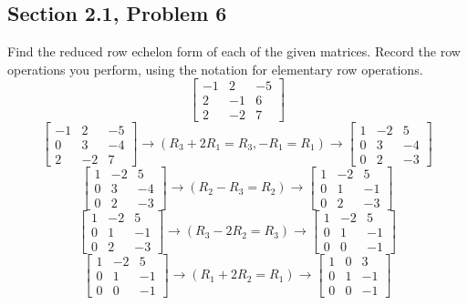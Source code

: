 \documentclass[letterpaper]{report}
\begin{document}
\subsection{Section 2.1, Problem 6}%
\label{sub:Section 2.1, Problem 6}
Find the reduced row echelon form of each of the given matrices. Record the row operations you perform, using the notation for elementary row operations. 
        \[
        \begin{bmatrix}
            -1 & 2 & -5 \\
            2 & -1 & 6 \\
            2 & -2 & 7
        \end{bmatrix}
   \] 
\[
\begin{bmatrix} 
    -1 & 2 & -5 \\
    0 & 3 & -4 \\
    2 & -2 & 7
\end{bmatrix} \to (R_3 + 2R_1 = R_3, -R_1 = R_1) \to
\begin{bmatrix} 
    1 & -2 & 5 \\
    0 & 3 & -4 \\
    0 & 2 & -3
\end{bmatrix} 
\] 
\[
\begin{bmatrix} 
    1 & -2 & 5 \\
    0 & 3 & -4 \\
    0 & 2 & -3
\end{bmatrix} 
\to (R_2 - R_3= R_2) \to 
\begin{bmatrix} 
    1 & -2 & 5 \\
    0 & 1 & -1 \\
    0 & 2 & -3
\end{bmatrix} 
\] 
\[
\begin{bmatrix} 
    1 & -2 & 5 \\
    0 & 1 & -1 \\
    0 & 2 & -3
\end{bmatrix} \to 
(R_3 - 2R_2 = R_3) \to
\begin{bmatrix} 
    1 & -2 & 5 \\
    0 & 1 & -1 \\
    0 & 0 & -1
\end{bmatrix}
\] 
\[
\begin{bmatrix} 
    1 & -2 & 5 \\
    0 & 1 & -1 \\
    0 & 0 & -1
\end{bmatrix}
\to (R_1 + 2R_2= R_1) \to 
\begin{bmatrix} 
    1 & 0 & 3 \\
    0 & 1 & -1 \\
    0 & 0 & -1  
\end{bmatrix} 
\] 
\end{document}
